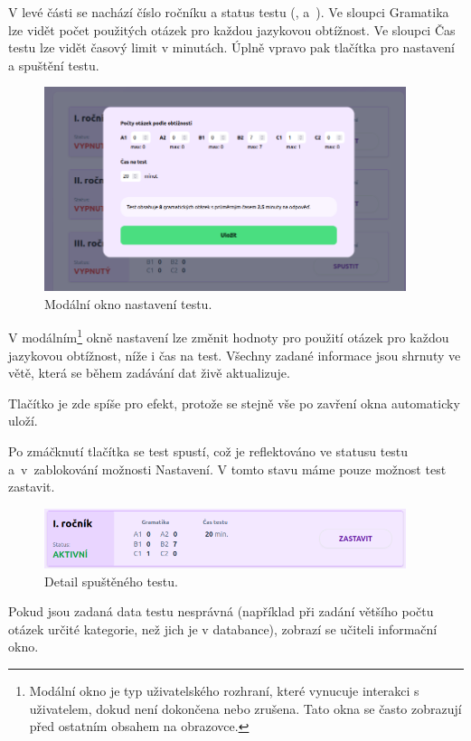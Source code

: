 V levé části se nachází číslo ročníku a status testu (,  a~). Ve sloupci Gramatika lze vidět počet použitých otázek pro každou jazykovou obtížnost. Ve sloupci Čas testu lze vidět časový limit v minutách. Úplně vpravo pak tlačítka pro nastavení a spuštění testu.

\begin{figure}[H]
    \centering
    \includegraphics[width=400px]{images/01design/test-modal.png}
    \caption{Modální okno nastavení testu.}
\end{figure}

V modálním\footnote{Modální okno je typ uživatelského rozhraní, které vynucuje interakci s uživatelem, dokud není dokončena nebo zrušena. Tato okna se často zobrazují před ostatním obsahem na obrazovce.} okně nastavení lze změnit hodnoty pro použití otázek pro každou jazykovou obtížnost, níže i čas na test. Všechny zadané informace jsou shrnuty ve větě, která se během zadávání dat živě aktualizuje.

Tlačítko  je zde spíše pro efekt, protože se stejně vše po zavření okna automaticky uloží.

Po zmáčknutí tlačítka  se test spustí, což je reflektováno ve statusu testu a~v~zablokování možnosti Nastavení. V tomto stavu máme pouze možnost test zastavit.

\begin{figure}[H]
    \centering
    \includegraphics[width=400px]{images/01design/test-running.png}
    \caption{Detail spuštěného testu.}
\end{figure}

Pokud jsou zadaná data testu nesprávná (například při zadání většího počtu otázek určité kategorie, než jich je v databance), zobrazí se učiteli informační okno.

